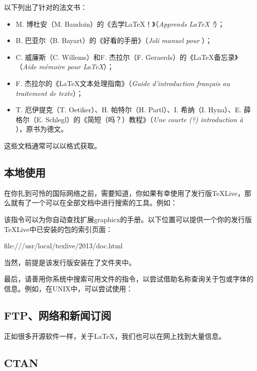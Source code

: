 以下列出了针对\LaTeXe 的法文书：

\begin{itemize}
    \item M. 博杜安（M. Baudoin）的《去学LaTeX！》（\emph{Apprends LaTeX !}）；
    \item B. 巴亚尔（B. Bayart）的《好看的\LaTeXe 手册》（\emph{Joli manuel pour \LaTeXe}）；
    \item C. 威廉斯（C. Willems）和F. 杰拉尔（F. Geraerds）的《\LaTeX 备忘录》（\emph{Aide mémoire pour \LaTeX}）；
    \item F. 杰拉尔的《\LaTeX 文本处理指南》（\emph{Guide d'introduction français au traitement de texte}）；
    \item T. 厄伊提克（T. Oetiker）、H. 帕特尔（H. Partl）、I. 希纳（I. Hyna）、E. 薛格尔（E. Schlegl）的《\LaTeXe 简短（吗？）教程》（\emph{Une courte (?) introduction à \LaTeXe}），原书为德文。
\end{itemize}

这些文档通常可以以格式获取。

\subsection{本地使用}

在你扎到可怜的国际网络之前，需要知道，你如果有幸使用了发行版\TeX Live，那么就有了一个可以在全部文档中进行搜索的工具。例如：


该指令可以为你自动查找扩展\textsf{graphicx}的手册。以下位置可以提供一个你的发行版\TeX Live中已安装的包的索引页面：

\begin{dmd}
file:///usr/local/texlive/2013/doc.html
\end{dmd}

当然，前提是该发行版安装在了文件夹中。

最后，请善用你系统中搜索可用文件的指令，以尝试借助名称查询关于包或字体的信息。例如，在UNIX中，可以尝试使用：


\subsection{FTP、网络和新闻订阅}

正如很多开源软件一样，关于\LaTeX ，我们也可以在网上找到大量信息。

\subsection{CTAN}


